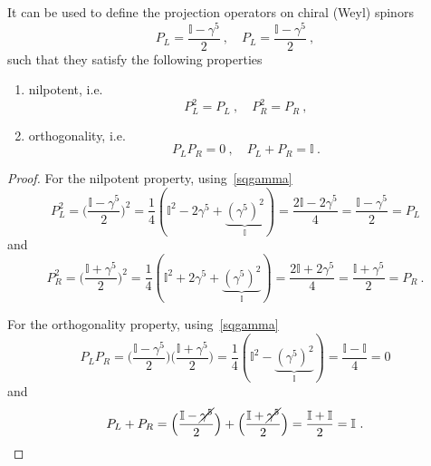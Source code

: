     It can be used to define the projection operators on chiral (Weyl) spinors
    \begin{equation}\label{proj}
        P_L = \frac{\mathbb I - \gamma^5}{2} ~, \quad P_L = \frac{\mathbb I - \gamma^5}{2} ~,
    \end{equation}
    such that they satisfy the following properties 
    \begin{enumerate}
        \item nilpotent, i.e. 
            \begin{equation*}
                P_L^2 = P_L ~, \quad P_R^2 = P_R ~,
            \end{equation*}
        \item orthogonality, i.e. 
            \begin{equation*}
                P_L P_R = 0 ~, \quad P_L + P_R = \mathbb I~.
            \end{equation*}
    \end{enumerate}
    \begin{proof}
        For the nilpotent property, using~\eqref{sqgamma}
        \begin{equation*}
            P_L^2 = \Big ( \frac{\mathbb I - \gamma^5}{2} \Big)^2 = \frac{1}{4} (\mathbb I^2 - 2 \gamma^5 + \underbrace{(\gamma^5)^2}_{\mathbb I} ) = \frac{2 \mathbb I - 2 \gamma^5}{4} = \frac{\mathbb I - \gamma^5}{2} = P_L
        \end{equation*}
        and 
        \begin{equation*}
            P_R^2 = \Big ( \frac{\mathbb I + \gamma^5}{2} \Big)^2 = \frac{1}{4} (\mathbb I^2 + 2 \gamma^5 + \underbrace{(\gamma^5)^2}_{\mathbb I} ) = \frac{2 \mathbb I + 2 \gamma^5}{4} = \frac{\mathbb I + \gamma^5}{2} = P_R ~.
        \end{equation*}

        For the orthogonality property, using~\eqref{sqgamma}
        \begin{equation*}
            P_L P_R = \Big ( \frac{\mathbb I - \gamma^5}{2} \Big)  \Big ( \frac{\mathbb I + \gamma^5}{2} \Big) = \frac{1}{4} (\mathbb I^2 - \underbrace{(\gamma^5)^2}_{\mathbb I} ) = \frac{\mathbb I - \mathbb I}{4} = 0
        \end{equation*}
        and
        \begin{equation*}
            P_L + P_R = \Big ( \frac{\mathbb I - \cancel{\gamma^5}}{2} \Big) + \Big ( \frac{\mathbb I + \cancel{\gamma^5}}{2} \Big) = \frac{\mathbb I + \mathbb I}{2} = \mathbb I ~.
        \end{equation*}
    \end{proof}
